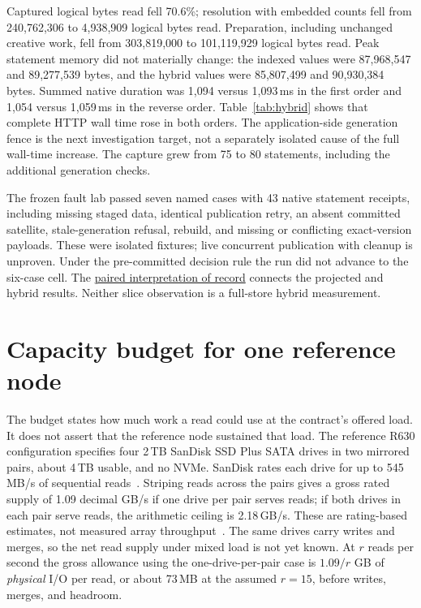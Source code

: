 \documentclass[sigconf,nonacm]{acmart}
\newcommand{\record}[2]{\href{https://github.com/jacoby149/web10/blob/2f397cb13/research/experiments/costfn/#1}{#2}}
\begin{document}
Captured logical bytes read fell 70.6\%; resolution with embedded counts fell from 240,762,306 to 4,938,909 logical bytes read. Preparation, including unchanged creative work, fell from 303,819,000 to 101,119,929 logical bytes read. Peak statement memory did not materially change: the indexed values were 87,968,547 and 89,277,539 bytes, and the hybrid values were 85,807,499 and 90,930,384 bytes. Summed native duration was 1,094 versus 1,093\,ms in the first order and 1,054 versus 1,059\,ms in the reverse order. Table~\ref{tab:hybrid} shows that complete HTTP wall time rose in both orders. The application-side generation fence is the next investigation target, not a separately isolated cause of the full wall-time increase. The capture grew from 75 to 80 statements, including the additional generation checks.

The frozen fault lab passed seven named cases with 43 native statement receipts, including missing staged data, identical publication retry, an absent committed satellite, stale-generation refusal, rebuild, and missing or conflicting exact-version payloads. These were isolated fixtures; live concurrent publication with cleanup is unproven. Under the pre-committed decision rule the run did not advance to the six-case cell. The \record{HYBRID-K20-FINDINGS.md}{paired interpretation of record} connects the projected and hybrid results. Neither slice observation is a full-store hybrid measurement.

\section{Capacity budget for one reference node}
\label{sec:budget}
The budget states how much work a read could use at the contract's offered load. It does not assert that the reference node sustained that load. The reference R630 configuration specifies four 2\,TB SanDisk SSD Plus SATA drives in two mirrored pairs, about 4\,TB usable, and no NVMe. SanDisk rates each drive for up to 545\,MB/s of sequential reads~\cite{sandisk}. Striping reads across the pairs gives a gross rated supply of 1.09 decimal GB/s if one drive per pair serves reads; if both drives in each pair serve reads, the arithmetic ceiling is 2.18\,GB/s. These are rating-based estimates, not measured array throughput~\cite{budget}. The same drives carry writes and merges, so the net read supply under mixed load is not yet known. At $r$ reads per second the gross allowance using the one-drive-per-pair case is $1.09/r$ GB of \emph{physical} I/O per read, or about 73\,MB at the assumed $r=15$, before writes, merges, and headroom.
\end{document}
